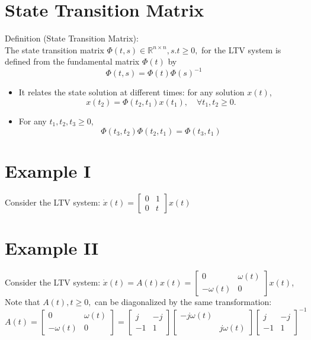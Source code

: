 \documentclass[10pt,a4paper,oneside]{article}
\begin{document}
\section{State Transition Matrix}
Definition (State Transition Matrix):\\
The state transition matrix $\Phi(t, s) \in \mathbb{R}^{n \times n}, s.t \geq 0,$ for the LTV system is defined from the fundamental matrix $\Phi(t)$ by
\[
\Phi(t, s)=\Phi(t) \Phi(s)^{-1}
\]
\begin{itemize}
\item It relates the state solution at different times: for any solution $x(t)$,
\[
x\left(t_{2}\right)=\Phi\left(t_{2}, t_{1}\right) x\left(t_{1}\right), \quad \forall t_{1}, t_{2} \geq 0.
\]
\item For any $t_1,t_2,t_3\geq0$,
\[
\Phi\left(t_{3}, t_{2}\right) \Phi\left(t_{2}, t_{1}\right)=\Phi\left(t_{3}, t_{1}\right)
\]
\end{itemize}
\section{Example I}
Consider the LTV system: $\dot{x}(t)=\left[\begin{array}{ll}{0} & {1} \\ {0} & {t}\end{array}\right] x(t)$
\section{Example II}
Consider the LTV system: $\dot{x}(t)=A(t) x(t)=\left[\begin{array}{cc}{0} & {\omega(t)} \\ {-\omega(t)} & {0}\end{array}\right] x(t)$, Note that $A(t), t \geq 0,$ can be diagonalized by the same transformation:
\[
A(t)=\left[\begin{array}{cc}{0} & {\omega(t)} \\ {-\omega(t)} & {0}\end{array}\right]=\left[\begin{array}{cc}{j} & {-j} \\ {-1} & {1}\end{array}\right]\left[\begin{array}{cc}{-j \omega(t)} & {} \\ {} & {j\omega(t)}\end{array}\right]\left[\begin{array}{cc}{j} & {-j} \\ {-1} & {1}\end{array}\right]^{-1}
\]
\end{document}
